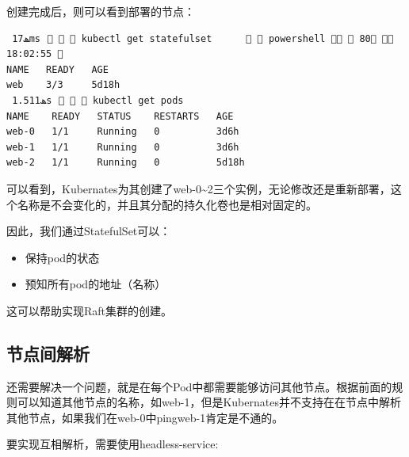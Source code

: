 \documentclass[12pt]{article}
\begin{document}
创建完成后，则可以看到部署的节点：

\begin{verbatim}
 ﮫ17ms⠀   kubectl get statefulset        powershell   80  18:02:55 
NAME   READY   AGE
web    3/3     5d18h
 ﮫ1.511s⠀   kubectl get pods
NAME    READY   STATUS    RESTARTS   AGE
web-0   1/1     Running   0          3d6h
web-1   1/1     Running   0          3d6h
web-2   1/1     Running   0          5d18h
\end{verbatim}

可以看到，Kubernates为其创建了web-0\textasciitilde2三个实例，无论修改还是重新部署，这个名称是不会变化的，并且其分配的持久化卷也是相对固定的。

因此，我们通过StatefulSet可以：

\begin{itemize}
\tightlist
\item
  保持pod的状态
\item
  预知所有pod的地址（名称）
\end{itemize}

这可以帮助实现Raft集群的创建。

\subsection{节点间解析}\label{ux8282ux70b9ux95f4ux89e3ux6790}

还需要解决一个问题，就是在每个Pod中都需要能够访问其他节点。根据前面的规则可以知道其他节点的名称，如web-1，但是Kubernates并不支持在在节点中解析其他节点，如果我们在web-0中pingweb-1肯定是不通的。

要实现互相解析，需要使用headless-service:

\begin{Shaded}
\begin{Highlighting}[]
\KeywordTok{:}
\KeywordTok{:}
\KeywordTok{:}
\AttributeTok{  }\KeywordTok{:}
\AttributeTok{  }\KeywordTok{:}
\AttributeTok{    }\KeywordTok{:}
\KeywordTok{:}
\AttributeTok{  }\KeywordTok{:}
\AttributeTok{  }\KeywordTok{{-}}\AttributeTok{ }\KeywordTok{:}\AttributeTok{ }
\AttributeTok{    }\KeywordTok{:}
\AttributeTok{  }\KeywordTok{:}
\AttributeTok{  }\KeywordTok{:}
\AttributeTok{    }\KeywordTok{:}
\end{Highlighting}
\end{Shaded}
\end{document}
